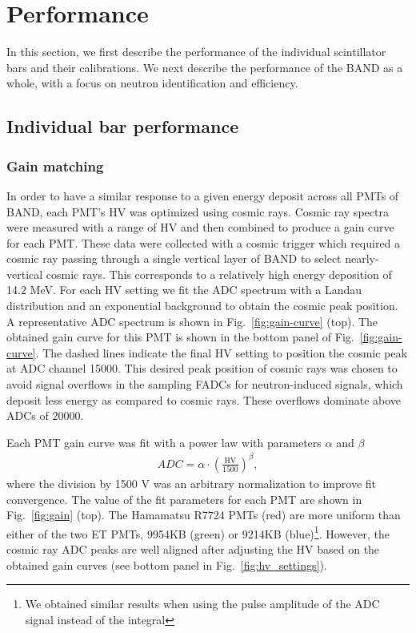 \documentclass[review,number,sort&compress]{elsarticle}
\begin{document}
\section{Performance}
In this section, we first describe the performance of the individual scintillator bars and their calibrations. We next describe the performance
of the BAND as a whole, with a focus on neutron identification and efficiency.

\subsection{Individual bar performance}
\subsubsection{Gain matching}
In order to have a similar response to a given energy deposit across all PMTs of BAND, each PMT's HV was optimized using cosmic rays. Cosmic
ray spectra were measured with a range of HV and then combined to produce a gain curve for each PMT. These data were
collected with a cosmic trigger which required a cosmic ray passing through a single vertical layer of BAND to select nearly-vertical
cosmic rays. This corresponds to a relatively high energy deposition of 14.2 \si{\mega\eV}. For each HV setting we fit the ADC spectrum
with a Landau distribution and an exponential background to obtain the cosmic peak position. A representative ADC spectrum is shown in
Fig.~\ref{fig:gain-curve} (top).  The obtained gain curve for this PMT is shown in the bottom panel of Fig.~\ref{fig:gain-curve}. The dashed lines indicate the final HV
setting to position the cosmic peak at ADC channel 15000. This desired peak
 position of cosmic rays was chosen to avoid signal overflows in the sampling FADCs for neutron-induced signals, which deposit less energy as compared to cosmic rays. These overflows dominate above ADCs of 20000. 

Each PMT gain curve was fit with a power law with parameters $\alpha$ and $\beta$
\begin{eqnarray}
	ADC	= \alpha \cdot \left(\frac{\mathrm{HV}}{1500}\right)^{\beta},				
		\label{eqn:gain_curve}
\end{eqnarray}
where the division by 1500 \si{\volt} was an arbitrary normalization to improve fit convergence. The value of the fit parameters for each PMT are
shown in Fig.~\ref{fig:gain} (top). The Hamamatsu R7724 PMTs (red) are more uniform than either of the two ET PMTs, 9954KB (green) or
9214KB (blue)\footnote{We obtained similar results when using the pulse amplitude of the ADC signal instead of the integral}. 
However, the cosmic ray ADC peaks are well aligned after adjusting the HV based on the obtained gain curves (see bottom panel in Fig.~\ref{fig:hv_settings}).
\end{document}
